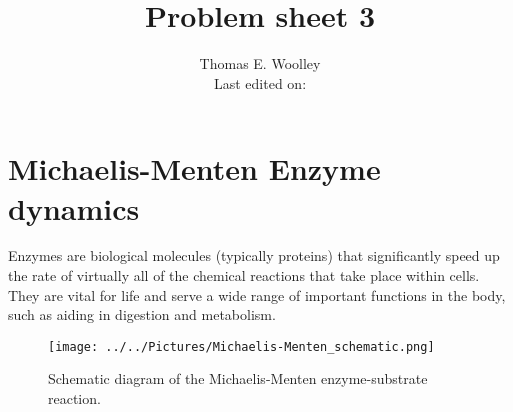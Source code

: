 \documentclass[]{article}
\begin{document}


\title{Problem sheet 3}
\author{Thomas E. Woolley\\Last edited on:}
\maketitle

\section{Michaelis-Menten Enzyme dynamics}
Enzymes are biological molecules (typically proteins) that significantly speed up the rate of virtually all of the chemical reactions that take place within cells. They are vital for life and serve a wide range of important functions in the body, such as aiding in digestion and metabolism.
\begin{figure}[h!!!tb]
\centering
\texttt{[image: ../../Pictures/Michaelis-Menten\_schematic.png]}
\caption{\label{Michaelis-Menten_schematic} Schematic diagram of the Michaelis-Menten enzyme-substrate reaction.}
\end{figure}
\end{document}
